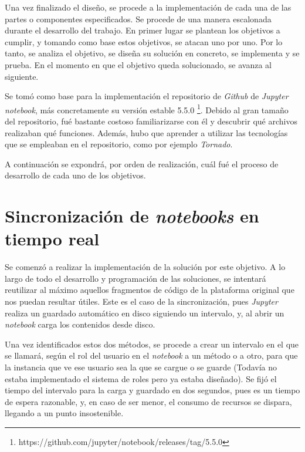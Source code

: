 \documentclass[11pt,spanish,listoffigures]{tfgetsinf}
\begin{document}
Una vez finalizado el diseño, se procede a la implementación de cada una de las partes o componentes especificados. Se procede de una manera escalonada durante el desarrollo del trabajo. En primer lugar se plantean los objetivos a cumplir, y tomando como base estos objetivos, se atacan uno por uno. Por lo tanto, se analiza el objetivo, se diseña su solución en concreto, se implementa y se prueba. En el momento en que el objetivo queda solucionado, se avanza al siguiente.

Se tomó como base para la implementación el repositorio de \textit{Github} de \textit{Jupyter notebook}, más concretamente su versión estable 5.5.0 \footnote{https://github.com/jupyter/notebook/releases/tag/5.5.0}. Debido al gran tamaño del repositorio, fué bastante costoso familiarizarse con él y descubrir qué archivos realizaban qué funciones. Además, hubo que aprender a utilizar las tecnologías que se empleaban en el repositorio, como por ejemplo \textit{Tornado}.

A continuación se expondrá, por orden de realización, cuál fué el proceso de desarrollo de cada uno de los objetivos.



\section{Sincronización de \textit{notebooks} en tiempo real}
\label{sec:desarrollo-sincro}

Se comenzó a realizar la implementación de la solución por este objetivo. A lo largo de todo el desarrollo y programación de las soluciones, se intentará reutilizar al máximo aquellos fragmentos de código de la plataforma original que nos puedan resultar útiles. Este es el caso de la sincronización, pues \textit{Jupyter} realiza un guardado automático en disco siguiendo un intervalo, y, al abrir un \textit{notebook} carga los contenidos desde disco.

Una vez identificados estos dos métodos, se procede a crear un intervalo en el que se llamará, según el rol del usuario en el \textit{notebook} a un método o a otro, para que la instancia que ve ese usuario sea la que se cargue o se guarde (Todavía no estaba implementado el sistema de roles pero ya estaba diseñado). Se fijó el tiempo del intervalo para la carga y guardado en dos segundos, pues es un tiempo de espera razonable, y, en caso de ser menor, el consumo de recursos se dispara, llegando a un punto insostenible.
\end{document}
